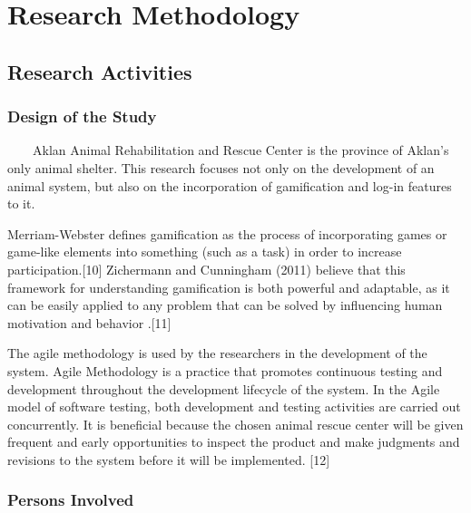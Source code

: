 \chapter{Research Methodology}
\begin{comment}
	~~~~This chapter discusses the methodologies employed by the researcher in the conduct of the study. These include the design of the study, persons involved, technical and software specifications, user specifications, testing and operation, system implementation, methods, procedure and calendar of activities. 
\end{comment}
\section{Research Activities}

\subsection{Design of the Study}
	
~~~~Aklan Animal Rehabilitation and Rescue Center is the province of Aklan's only animal shelter. This research focuses not only on the development of an animal system, but also on the incorporation of gamification and log-in features to it.

Merriam-Webster defines gamification as the process of incorporating games or game-like elements into something (such as a task) in order to increase participation.[10] Zichermann and Cunningham (2011) believe that this framework for understanding gamification is both powerful and adaptable, as it can be easily applied to any problem that can be solved by influencing human motivation and behavior .[11]

The agile methodology is used by the researchers in the development of the system. Agile Methodology is a practice that promotes continuous testing and development throughout the development lifecycle of the system. In the Agile model of software testing, both development and testing activities are carried out concurrently. It is beneficial because the chosen animal rescue center will be given frequent and early opportunities to inspect the product and make judgments and revisions to the system before it will be implemented. [12]

\subsection{Persons Involved}

